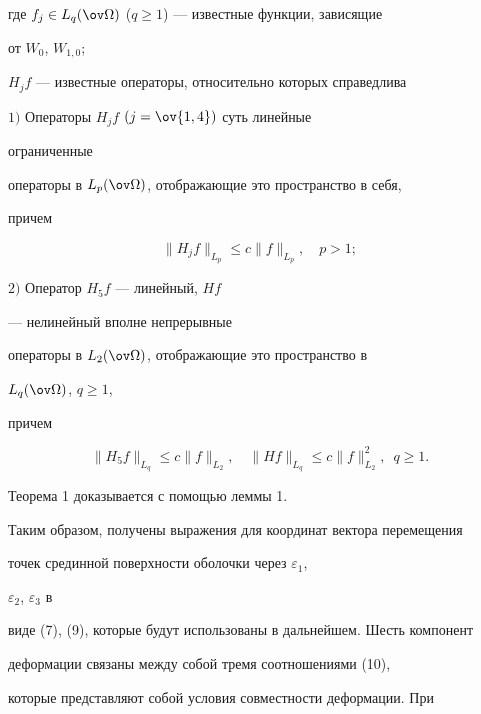 где $f_j\in L_q(\ov\Omega)$ ($q\ge 1$) --- известные функции, зависящие 


от $W_0$, $W_{1,0}$; 


$H_jf$ --- известные операторы, относительно которых справедлива 


 


\begin{thm} $1)$ Операторы $H_jf$ $(j=\ov{1,4})$ суть линейные 


ограниченные  


операторы в $L_p(\ov\Omega)$, отображающие это пространство в себя, 


причем 


$$ 


\|H_jf\|_{L_p}\le c\|f\|_{L_p},\quad p>1; 


$$ 


 


$2)$ Оператор $H_5f$ --- линейный, $Hf$ 


--- нелинейный вполне непрерывные  


операторы в $L_2(\ov\Omega)$, отображающие это пространство в 


$L_q(\ov\Omega)$, $q\ge 1$, 


причем 


$$ 


\|H_5f\|_{L_q}\le c\|f\|_{L_2},\quad 


\|Hf\|_{L_q}\le c\|f\|^2_{L_2},\ \;q\ge 1. 


$$ 


\end{thm} 


 


Теорема 1 доказывается с помощью леммы 1. 


 


Таким образом, получены выражения для координат вектора перемещения  


точек срединной поверхности оболочки через $\varepsilon_1$, 


$\varepsilon_2$, $\varepsilon_3$ в 


виде (7), (9), которые будут использованы в дальнейшем. Шесть компонент  


деформации связаны между собой тремя соотношениями (10), 


которые представляют собой условия совместности деформации. При 


